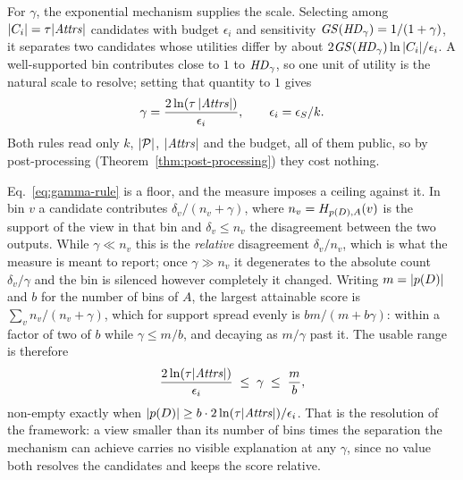 For $\gamma$, the exponential mechanism supplies the scale.
Selecting among $|C_i|=\tau|\mathit{Attrs}|$ candidates with budget $\epsilon_i$ and sensitivity $\mathit{GS}(\mathit{HD}_\gamma)=1/(1+\gamma)$, it separates two candidates whose utilities differ by about $2\mathit{GS}(\mathit{HD}_\gamma)\ln|C_i|/\epsilon_i$.
A well-supported bin contributes close to $1$ to $\mathit{HD}_\gamma$, so one unit of utility is the natural scale to resolve; setting that quantity to $1$ gives
\begin{equation}
\gamma=\frac{2\ln(\tau\,|\mathit{Attrs}|)}{\epsilon_i},\qquad \epsilon_i=\epsilon_S/k .
\label{eq:gamma-rule}
\end{equation}
Both rules read only $k$, $|\mathcal{P}|$, $|\mathit{Attrs}|$ and the budget, all of them public, so by post-processing (Theorem~\ref{thm:post-processing}) they cost nothing.

\begin{remark}
\label{rem:gamma-window}
Eq.~\eqref{eq:gamma-rule} is a floor, and the measure imposes a ceiling against it.
In bin $v$ a candidate contributes $\delta_v/(n_v+\gamma)$, where $n_v=H_{p(D),A}(v)$ is the support of the view in that bin and $\delta_v\le n_v$ the disagreement between the two outputs.
While $\gamma\ll n_v$ this is the \emph{relative} disagreement $\delta_v/n_v$, which is what the measure is meant to report; once $\gamma\gg n_v$ it degenerates to the absolute count $\delta_v/\gamma$ and the bin is silenced however completely it changed.
Writing $m=|p(D)|$ and $b$ for the number of bins of $A$, the largest attainable score is $\sum_v n_v/(n_v+\gamma)$, which for support spread evenly is $bm/(m+b\gamma)$: within a factor of two of $b$ while $\gamma\le m/b$, and decaying as $m/\gamma$ past it.
The usable range is therefore
\begin{equation}
\frac{2\ln(\tau|\mathit{Attrs}|)}{\epsilon_i}\;\le\;\gamma\;\le\;\frac{m}{b},
\label{eq:gamma-window}
\end{equation}
non-empty exactly when $|p(D)|\ge b\cdot2\ln(\tau|\mathit{Attrs}|)/\epsilon_i$.
That is the resolution of the framework: a view smaller than its number of bins times the separation the mechanism can achieve carries no visible explanation at any $\gamma$, since no value both resolves the candidates and keeps the score relative.
\end{remark}

